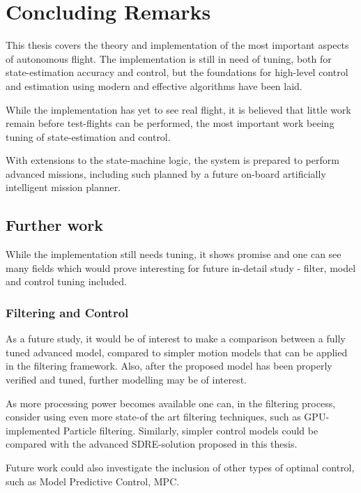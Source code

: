 \chapter{Concluding Remarks}
\label{cha:conclusions}
    This thesis covers the theory and implementation of the most
    important aspects of autonomous flight. The implementation is
    still in need of tuning, both for state-estimation accuracy and control,
    but the foundations for high-level control and estimation using
    modern and effective algorithms have been laid.

    While the implementation has yet to see real flight, it is believed
    that little work remain before test-flights can be performed,
    the most important work beeing tuning of state-estimation and control.

    With extensions to the state-machine logic, the system is prepared to
    perform advanced missions, including such planned by a future on-board
    artificially intelligent mission planner.

\section{Further work}
\label{sec:conclusions:furtherwork}
    While the implementation still needs tuning, it shows promise
    and one can see many fields which would prove interesting for
    future in-detail study - filter, model and control tuning included.

    \subsection{Filtering and Control}
        As a future study, it would be of interest to make a comparison between
        a fully tuned advanced model, compared to simpler motion models that
        can be applied in the filtering framework.
        Also, after the proposed model has been properly verified and tuned, further
        modelling may be of interest.

        As more processing power becomes available one can, in the filtering
        process, consider using even more state-of the art filtering techniques,
        such as GPU-implemented Particle filtering.
        Similarly, simpler control models could be compared with the
        advanced SDRE-solution proposed in this thesis.

        Future work could also investigate the inclusion of other types of
        optimal control, such as Model Predictive Control, MPC.


